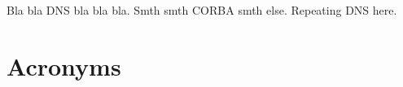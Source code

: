 \documentclass{article}
\begin{document}
Bla bla \ac{DNS} bla bla bla.
Smth smth \ac{CORBA} smth else.
Repeating \ac{DNS} here.

\appendix

\section{Acronyms}
\begin{acronym}[CORBA]	%
\end{acronym}
\end{document}
